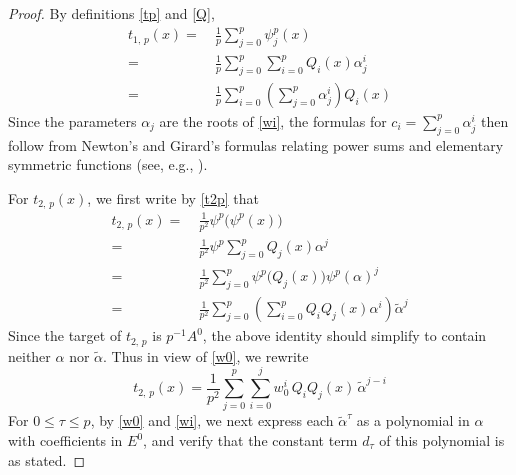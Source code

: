 \documentclass{gtpart}
\theoremstyle{definition}
\theoremstyle{remark}
\newcommand{\A}{\alpha}
\newcommand{\T}{\tau}
\renewcommand{\=}{\approx}
\renewcommand{\-}{\sim}
\numberwithin{equation}{section}
\numberwithin{thm}{section}
\begin{document}
\begin{proof}
 By definitions \eqref{tp} and \eqref{Q}, 
 \begin{equation*}
  \begin{split}
   t_{1,\,p}(x) = & ~ \frac{1}{p} \sum_{j=0}^p \psi^p_j(x) \\
                = & ~ \frac{1}{p} \sum_{j=0}^p \sum_{i=0}^p Q_i(x) \A_j^i \\
                = & ~ \frac{1}{p} \sum_{i=0}^p \left( \sum_{j=0}^p \A_j^i \right) Q_i(x) 
  \end{split}
 \end{equation*}
 Since the parameters $\A_j$ are the roots of \eqref{wi}, the formulas for 
 $c_i = \sum_{j=0}^p \A_j^i$ then follow from Newton's and Girard's formulas relating power sums and elementary symmetric functions 
 (see, e.g., \cite[Problem 16-A]{cc}).  

 For $t_{2,\,p}(x)$, we first write by \eqref{t2p} that 
 \begin{equation*}
  \begin{split}
   t_{2,\,p}(x) = & ~ \frac{1}{p^2} \psi^p \big( \psi^p(x) \big) \\
                = & ~ \frac{1}{p^2} \psi^p \sum_{j=0}^p Q_j(x) \A^j \\
                = & ~ \frac{1}{p^2} \sum_{j=0}^p \psi^p \big( Q_j(x) \big) \psi^p(\A)^j \\
                = & ~ \frac{1}{p^2} \sum_{j=0}^p \left( \sum_{i=0}^p Q_i Q_j(x) \A^i \right) \widetilde{\A}^j 
  \end{split}
 \end{equation*}
 Since the target of $t_{2,\,p}$ is $p^{-1} A^0$, 
 the above identity should simplify to contain neither $\A$ nor $\widetilde{\A}$.  
 Thus in view of \eqref{w0}, we rewrite 
 \[
  t_{2,\,p}(x) = \frac{1}{p^2} \sum_{j=0}^p \sum_{i=0}^j w_0^i \, Q_i Q_j(x) \, \widetilde{\A}^{j - i} 
 \]
 For $0 \leq \T \leq p$, by \eqref{w0} and \eqref{wi}, 
 we next express each $\widetilde{\A}^\T$ as a polynomial in $\A$ 
 with coefficients in $E^0$, 
 and verify that the constant term $d_\T$ of this polynomial is as stated.  


\end{proof}
\end{document}
